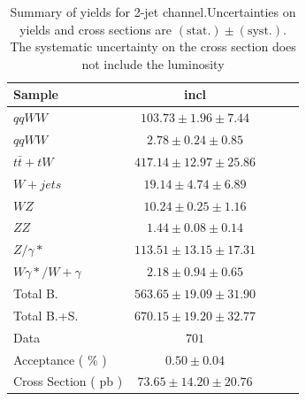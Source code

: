\begin{table}[!ht]
{\small
\begin{center}
\begin{tabular}{|l|c|c|c|c|}
\hline
Sample  & incl  \\ \hline
$qqWW$  & $103.73 \pm 1.96 \pm 7.44 $   \\
$qqWW$  & $2.78 \pm 0.24 \pm 0.85 $ \\
$t\bar{t} + tW$ & $417.14 \pm 12.97 \pm 25.86 $ \\
$W+jets$    & $19.14 \pm 4.74 \pm 6.89 $    \\
$WZ$    & $10.24 \pm 0.25 \pm 1.16 $    \\
$ZZ$    & $1.44 \pm 0.08 \pm 0.14 $ \\
$Z/\gamma*$ & $113.51 \pm 13.15 \pm 17.31 $ \\
$W\gamma*/W+\gamma$ & $2.18 \pm 0.94 \pm 0.65 $ \\
\hline \hline
Total B.    & $563.65 \pm 19.09 \pm 31.90 $ \\ \hline \hline
Total B.+S. & $670.15 \pm 19.20 \pm 32.77 $ \\ \hline \hline
Data    & $701$     \\ \hline \hline
Acceptance ( \% )   & $0.50 \pm 0.04    $\\
Cross Section ( pb )    & $73.65 \pm 14.20 \pm 20.76$   \\ \hline
\end{tabular}
\caption{Summary of yields for 2-jet channel.Uncertainties on yields and cross sections are $\mathrm{(stat.)} \pm \mathrm{(syst.)}$. The systematic uncertainty on the cross section does not include the luminosity}
\label{tab:datayields_wwxsec_2j_incl}
\end{center}}
\end{table}

